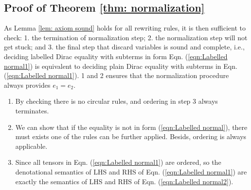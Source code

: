 \subsection{Proof of Theorem \ref{thm: normalization}}
As Lemma \ref{lem: axiom sound} holds for all rewriting rules, it is then sufficient to check: 1. the termination of normalization step; 2. the normalization step will not get stuck; and 3. the final step that discard variables is sound and complete, i.e., deciding labelled Dirac equality with subterms in form Eqn. (\ref{eqn:Labelled normal1}) is equivalent to deciding plain Dirac equality with subterms in Eqn. (\ref{eqn:Labelled normal1}). 1 and 2 ensures that the normalization procedure always provides $e_1 = e_2$.
\begin{enumerate}
  \item By checking there is no circular rules, and ordering in step 3 always terminates.
  \item We can show that if the equality is not in form (\ref{eqn:Labelled normal}), there must exists one of the rules can be further applied. Besids, ordering is always applicable.
  \item Since all tensors in Eqn. (\ref{eqn:Labelled normal1}) are ordered, so the denotational semantics of LHS and RHS of Eqn. (\ref{eqn:Labelled normal1}) are exactly the semantics of LHS and RHS of Eqn. (\ref{eqn:Labelled normal2}).
\end{enumerate}



